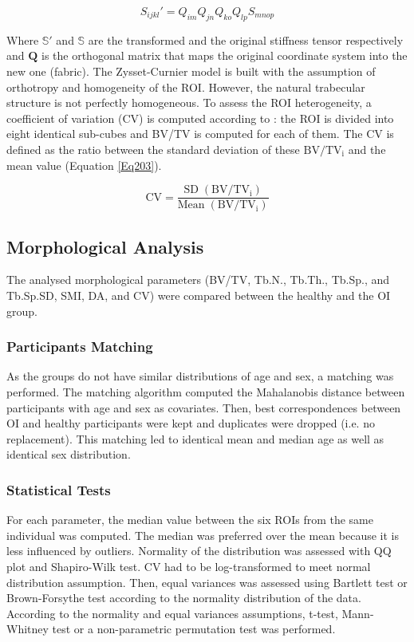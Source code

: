 \documentclass[a4paper,fleqn]{DC_ArtStyle}
\begin{document}
	\begin{equation}
	S_{ijkl}' = Q_{im}Q_{jn}Q_{ko}Q_{lp} S_{mnop}
	\label{Eq203p}
	\end{equation}
	
	Where $\mathbb{S}'$ and $\mathbb{S}$ are the transformed and the original stiffness tensor respectively and $\mathbf{Q}$ is the orthogonal matrix that maps the original coordinate system into the new one (fabric). The Zysset-Curnier model is built with the assumption of orthotropy and homogeneity of the ROI. However, the natural trabecular structure is not perfectly homogeneous. To assess the ROI heterogeneity, a coefficient of variation (CV) is computed according to \citeauthor{Panyasantisuk2015}\cite{Panyasantisuk2015}: the ROI is divided into eight identical sub-cubes and BV/TV is computed for each of them. The CV is defined as the ratio between the standard deviation of these $\mathrm{BV/TV_i}$ and the mean value (Equation \ref{Eq203}).
	
	\begin{equation}
	\mathrm{CV} = \frac{\mathrm{SD\;(BV/TV_i)}}{\mathrm{Mean\;(BV/TV_i)}}
	\label{Eq203}
	\end{equation}
	
	\subsection{Morphological Analysis}
	The analysed morphological parameters (BV/TV, Tb.N., Tb.Th., Tb.Sp., and Tb.Sp.SD, SMI, DA, and CV) were compared between the healthy and the OI group.
	
	\subsubsection{Participants Matching}
	As the groups do not have similar distributions of age and sex, a matching was performed. The matching algorithm computed the Mahalanobis distance between participants with age and sex as covariates. Then, best correspondences between OI and healthy participants were kept and duplicates were dropped (i.e. no replacement)\cite{Stuart2010}. This matching led to identical mean and median age as well as identical sex distribution.
	
	\subsubsection{Statistical Tests}
	For each parameter, the median value between the six ROIs from the same individual was computed. The median was preferred over the mean because it is less influenced by outliers. Normality of the distribution was assessed with QQ plot and Shapiro-Wilk test. CV had to be log-transformed to meet normal distribution assumption. Then, equal variances was assessed using Bartlett test or Brown-Forsythe test according to the normality distribution of the data. According to the normality and equal variances assumptions, t-test, Mann-Whitney test or a non-parametric permutation test was performed. 
	
\end{document}
